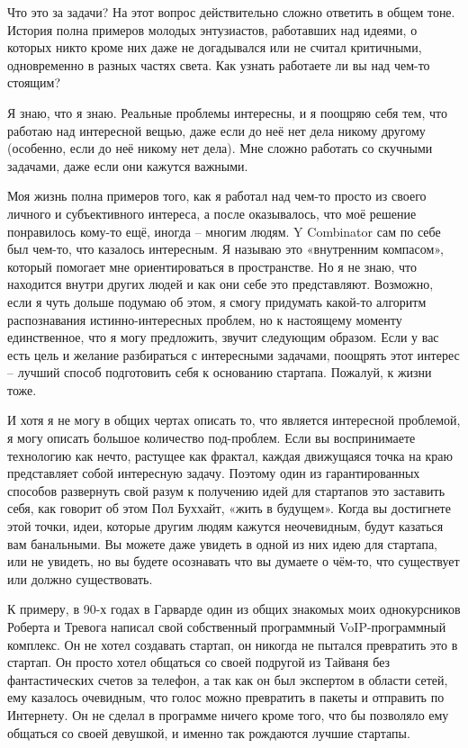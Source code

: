 \documentclass[ebook,12pt,oneside,openany]{memoir}
\begin{document}
Что это за задачи? На этот вопрос действительно сложно ответить в
общем тоне. История полна примеров молодых энтузиастов, работавших над
идеями, о которых никто кроме них даже не догадывался или не считал
критичными, одновременно в разных частях света. Как узнать работаете
ли вы над чем-то стоящим? \newline

Я знаю, что я знаю. Реальные проблемы интересны, и я поощряю себя тем,
что работаю над интересной вещью, даже если до неё нет дела никому
другому (особенно, если до неё никому нет дела). Мне сложно работать
со скучными задачами, даже если они кажутся важными. \newline

Моя жизнь полна примеров того, как я работал над чем-то просто из
своего личного и субъективного интереса, а после оказывалось, что моё
решение понравилось кому-то ещё, иногда – многим людям. Y Combinator
сам по себе был чем-то, что казалось интересным. Я называю это
«внутренним компасом», который помогает мне ориентироваться в
пространстве. Но я не знаю, что находится внутри других людей и как
они себе это представляют. Возможно, если я чуть дольше подумаю об
этом, я смогу придумать какой-то алгоритм распознавания
истинно-интересных проблем, но к настоящему моменту единственное, что
я могу предложить, звучит следующим образом. Если у вас есть цель и
желание разбираться с интересными задачами, поощрять этот интерес –
лучший способ подготовить себя к основанию стартапа. Пожалуй, к жизни
тоже. \newline

И хотя я не могу в общих чертах описать то, что является интересной
проблемой, я могу описать большое количество под-проблем. Если вы
воспринимаете технологию как нечто, растущее как фрактал, каждая
движущаяся точка на краю представляет собой интересную задачу. Поэтому
один из гарантированных способов развернуть свой разум к получению
идей для стартапов это заставить себя, как говорит об этом Пол
Буххайт, «жить в будущем». Когда вы достигнете этой точки, идеи,
которые другим людям кажутся неочевидным, будут казаться вам
банальными. Вы можете даже увидеть в одной из них идею для стартапа,
или не увидеть, но вы будете осознавать что вы думаете о чём-то, что
существует или должно существовать. \newline

К примеру, в 90-х годах в Гарварде один из общих знакомых моих
однокурсников Роберта и Тревога написал свой собственный программный
VoIP-программный комплекс. Он не хотел создавать стартап, он никогда
не пытался превратить это в стартап. Он просто хотел общаться со своей
подругой из Тайваня без фантастических счетов за телефон, а так как он
был экспертом в области сетей, ему казалось очевидным, что голос можно
превратить в пакеты и отправить по Интернету. Он не сделал в программе
ничего кроме того, что бы позволяло ему общаться со своей девушкой, и
именно так рождаются лучшие стартапы. \newline
\end{document}
